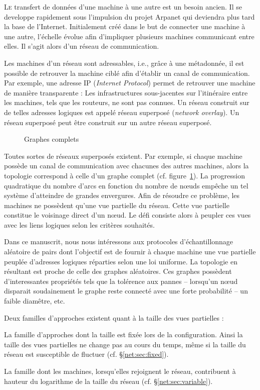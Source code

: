 
\lettrine{L}e transfert de données d'une machine à une autre est un besoin
ancien. Il se developpe rapidement sous l'impulsion du projet Arpanet qui
deviendra plus tard la base de l'Internet. Initialement créé dans le but de
connecter une machine à une autre, l'échelle évolue afin d'impliquer plusieurs
machines communicant entre elles. Il s'agit alors d'un réseau de communication.

Les machines d'un réseau sont adressables, i.e., grâce à une métadonnée, il est
possible de retrouver la machine ciblé afin d'établir un canal de
communication. Par exemple, une adresse IP (\emph{Internet Protocol}) permet de
retrouver une machine de manière transparente : Les infrastructures
sous-jacentes sur l'itinéraire entre les machines, tels que les routeurs, ne
sont pas connues. Un réseau construit sur de telles adresses logiques est appelé
réseau superposé (\emph{network overlay}). Un réseau superposé peut être
construit sur un autre réseau superposé.

\begin{figure}
  \centering 
  
  \caption{\label{net:fig:completegraph}Graphes complets}
\end{figure}

Toutes sortes de réseaux superposés existent. Par exemple, si chaque machine
possède un canal de communication avec chacunes des autres machines, alors la
topologie correspond à celle d'un graphe complet
(cf. figure~\ref{net:fig:completegraph}). La progression quadratique du nombre
d'arcs en fonction du nombre de nœuds empêche un tel système d'atteindre de
grandes envergures. Afin de résoudre ce problème, les machines ne possèdent
qu'une vue partielle du réseau. Cette vue partielle constitue le voisinage
direct d'un nœud. Le défi consiste alors à peupler ces vues avec les liens
logiques selon les critères souhaités.

Dans ce manuscrit, nous nous intéressons aux protocoles d'échantillonnage
aléatoire de pairs dont l'objectif est de fournir à chaque machine une vue
partielle peuplée d'adresses logiques réparties selon une loi uniforme. La
topologie en résultant est proche de celle des graphes aléatoires. Ces graphes
possèdent d'interessantes propriétés tels que la tolérence aux pannes --
lorsqu'un nœud disparait soudainement le graphe reste connecté avec une forte
probabilité -- un faible diamêtre, etc.

Deux familles d'approches existent quant à la taille des vues partielles :
\begin{inparaenum}[(i)]
\item La famille d'approches dont la taille est fixée lors de la
  configuration. Ainsi la taille des vues partielles ne change pas au cours du
  temps, même si la taille du réseau est susceptible de fluctuer
  (cf. §\ref{net:sec:fixed}).
\item La famille dont les machines, lorsqu'elles rejoignent le réseau,
  contribuent à hauteur du logarithme de la taille du réseau
  (cf. §\ref{net:sec:variable}).
\end{inparaenum}


